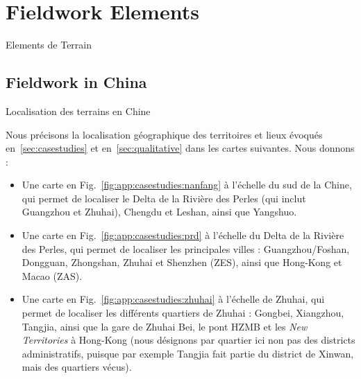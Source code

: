 



\newpage

\section{Fieldwork Elements}{Elements de Terrain}

\label{app:sec:qualitative}



\subsection{Fieldwork in China}{Localisation des terrains en Chine}


Nous précisons la localisation géographique des territoires et lieux évoqués en~\ref{sec:casestudies} et en~\ref{sec:qualitative} dans les cartes suivantes. Nous donnons :
\begin{itemize}
	\item Une carte en Fig.~\ref{fig:app:casestudies:nanfang} à l'échelle du sud de la Chine, qui permet de localiser le Delta de la Rivière des Perles (qui inclut Guangzhou et Zhuhai), Chengdu et Leshan, ainsi que Yangshuo.
	\item Une carte en Fig.~\ref{fig:app:casestudies:prd} à l'échelle du Delta de la Rivière des Perles, qui permet de localiser les principales villes : Guangzhou/Foshan, Dongguan, Zhongshan, Zhuhai et Shenzhen (ZES), ainsi que Hong-Kong et Macao (ZAS).
	\item Une carte en Fig.~\ref{fig:app:casestudies:zhuhai} à l'échelle de Zhuhai, qui permet de localiser les différents quartiers de Zhuhai : Gongbei, Xiangzhou, Tangjia, ainsi que la gare de Zhuhai Bei, le pont HZMB et les \emph{New Territories} à Hong-Kong (nous désignons par quartier ici non pas des districts administratifs, puisque par exemple Tangjia fait partie du district de Xinwan, mais des quartiers vécus).
\end{itemize}



